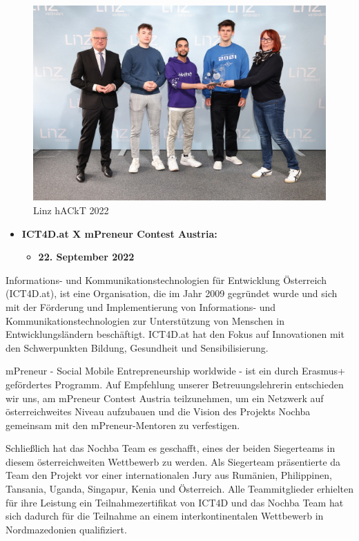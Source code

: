 \begin{figure}[H]
    \centering
    \includegraphics[width=1\textwidth]{pics/Linz-hACkT-2022.jpg}
    \caption{Linz hACkT 2022}
    \label{fig:linz-hackt}
\end{figure}


\begin{itemize}
    \item \textbf{ICT4D.at X mPreneur Contest Austria:}
          \begin{itemize}
              \item \textbf{22. September 2022}
          \end{itemize}
\end{itemize}


Informations- und Kommunikationstechnologien für Entwicklung Österreich (ICT4D.at), ist eine Organisation, die im Jahr 2009 gegründet wurde und sich mit der Förderung und Implementierung von Informations- und Kommunikationstechnologien zur Unterstützung von Menschen in Entwicklungsländern beschäftigt. ICT4D.at hat den Fokus auf Innovationen mit den Schwerpunkten Bildung, Gesundheit und Sensibilisierung.

mPreneur - Social Mobile Entrepreneurship worldwide - ist ein durch Erasmus+ gefördertes Programm. Auf Empfehlung unserer Betreuungslehrerin entschieden wir uns, am mPreneur Contest Austria teilzunehmen, um ein Netzwerk auf österreichweites Niveau aufzubauen und die Vision des Projekts Nochba gemeinsam mit den mPreneur-Mentoren zu verfestigen.

Schließlich hat das Nochba Team es geschafft, eines der beiden Siegerteams in diesem österreichweiten Wettbewerb zu werden. Als Siegerteam präsentierte da Team den Projekt vor einer internationalen Jury aus Rumänien, Philippinen, Tansania, Uganda, Singapur, Kenia und Österreich. Alle Teammitglieder erhielten für ihre Leistung ein Teilnahmezertifikat von ICT4D und das Nochba Team hat sich dadurch für die Teilnahme an einem interkontinentalen Wettbewerb in Nordmazedonien qualifiziert.

